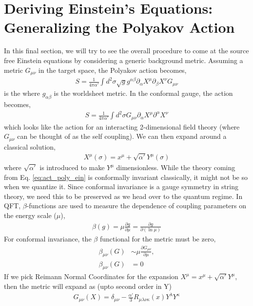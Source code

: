 \documentclass{article}
\begin{document}
\section{Deriving Einstein's Equations: Generalizing the Polyakov Action}
In this final section, we will try to see the overall procedure to come at the source free Einstein equations by considering a generic background metric. Assuming a metric $G_{\mu\nu}$ in the target space, the Polyakov action becomes,
\begin{align}
    S=\frac{1}{4\pi\alpha'}\int d^2\sigma \sqrt{g}g^{\alpha\beta} \partial_\alpha X^\mu\partial_\beta X^\nu G_{\mu\nu}
\end{align} is the 
where $g_{\alpha\beta}$ is the worldsheet metric. In the conformal gauge, the action becomes,
\begin{align}
    S=\frac{1}{4\pi\alpha'}\int d^2\sigma G_{\mu\nu}\partial_\alpha X^\mu\partial^\alpha X^\nu\label{eq:act_poly_ein}
\end{align}
which looks like the action for an interacting 2-dimensional field theory (where $G_{\mu\nu}$ can be thought of as the self coupling). We can then expand around a classical solution,
\begin{align}
    X^\mu(\sigma)=x^\mu +\sqrt{\alpha'}Y^\mu(\sigma)
\end{align}
where $\sqrt{\alpha'}$ is introduced to make $Y^\mu$ dimensionless. While the theory coming from Eq. \eqref{eq:act_poly_ein} is conformally invariant classically, it might not be so when we quantize it. Since conformal invariance is a gauge symmetry in string theory, we need this to be preserved as we head over to the quantum regime. In QFT, $\beta$-functions are used to measure the dependence of coupling parameters on the energy scale ($\mu$),
\begin{align}
    \beta(g) = \mu\frac{\partial g}{\partial \mu} = \frac{\partial g}{\partial(\ln\mu)}
\end{align}
For conformal invariance, the $\beta$ functional for the metric must be zero,
\begin{align}
    \beta_{\mu\nu}(G)&\sim \mu\frac{\partial G_{\mu\nu}}{\partial\mu},\\
    \beta_{\mu\nu}(G)&=0
\end{align}
If we pick Reimann Normal Coordinates for the expansion $X^\mu=x^\mu+\sqrt{\alpha'}Y^\mu$, then the metric will expand as (upto second order in Y)
\begin{align}
    G_{\mu\nu}(X)=\delta_{\mu\nu}-\frac{\alpha'}{3}R_{\mu\lambda\nu\kappa}(x)Y^\lambda Y^\kappa
\end{align}
\end{document}
